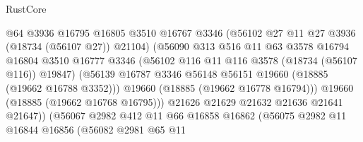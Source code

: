 \begin{lexlean}{RustCore}
\begin{coremodule}
                                        @64
                                        @3936
                                        @16795
                                        @16805
                                        @3510
                                        @16767
                                        @3346
                                        (@56102 @27 @11 @27 @3936 (@18734 (@56107 @27)) @21104)
                                        (@56090
                                          @313
                                          @516
                                          @11
                                          @63
                                          @3578
                                          @16794
                                          @16804
                                          @3510
                                          @16777
                                          @3346
                                          (@56102 @116 @11 @116 @3578 (@18734 (@56107 @116)) @19847)
                                          (@56139
                                            @16787
                                            @3346
                                            @56148
                                            @56151
                                            @19660
                                            (@18885 (@19662 @16788 @3352)))
                                          @19660
                                          (@18885 (@19662 @16778 @16794)))
                                        @19660
                                        (@18885 (@19662 @16768 @16795)))
                                      @21626
                                      @21629
                                      @21632
                                      @21636
                                      @21641
                                      @21647))
                                  (@56067
                                    @2982
                                    @412
                                    @11
                                    @66
                                    @16858
                                    @16862
                                    (@56075
                                      @2982
                                      @11
                                      @16844
                                      @16856
                                      (@56082
                                        @2981
                                        @65
                                        @11

\end{coremodule}
\end{lexlean}
